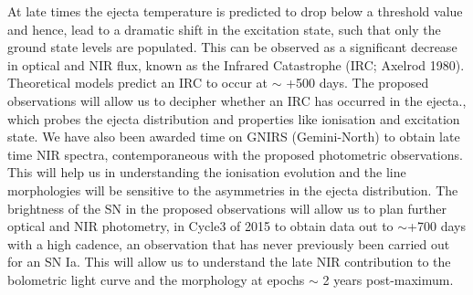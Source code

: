 \documentclass[11pt]{article}
\begin{document}
{%
At late times the ejecta temperature is predicted to drop below a threshold value and hence, lead to a dramatic shift in the excitation state, such that only the ground state levels are populated. This can be observed as a significant decrease in optical and NIR flux, known as the Infrared Catastrophe (IRC; Axelrod 1980). Theoretical models predict an IRC to occur at $\sim$ +500 days. The proposed observations will allow us to decipher whether an IRC has occurred in the ejecta., which probes the ejecta distribution and properties like ionisation and excitation state.  
We have also been awarded time on GNIRS (Gemini-North) to obtain late time NIR spectra, contemporaneous with the proposed photometric observations. This will help us in understanding the ionisation evolution and the line morphologies will be sensitive to the asymmetries in the ejecta distribution. The brightness of the SN in the proposed observations will allow us to plan further optical and  NIR photometry, in Cycle3 of 2015 to obtain data out to $\sim$+700 days with a high cadence, an observation that has never previously been carried out for an SN Ia. This will allow us to understand the late NIR contribution to the bolometric light curve and the morphology at epochs $\sim$ 2 years post-maximum.

 
}
\end{document}
